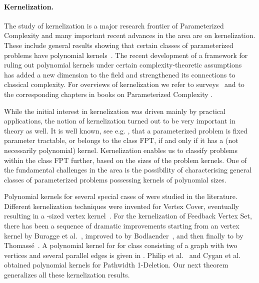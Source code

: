   






\vspace{-.3cm}
\paragraph{Kernelization.}
The study of kernelization is a major research frontier of 
Parameterized Complexity and many important recent advances in the area
are on kernelization. These include 
general results
showing that  certain classes of parameterized problems have polynomial kernels~\cite{Alon:2010vp,H.Bodlaender:2009ng,FominLST10,KratschW12}. 
The recent development of a framework for ruling out polynomial kernels under
certain complexity-theoretic
assumptions~\cite{BDFH08,Dell:2010sh,FS08}    has added a new dimension to
the field and strengthened its connections to classical complexity.  For overviews of kernelization we  refer to surveys~\cite{Bodlaender09,GN07SIGACT}  and to the corresponding chapters in books on Parameterized Complexity 
\cite{FlumGroheBook,Niedermeierbook06}.

While the initial interest in kernelization was driven mainly by practical applications, the notion of kernelization turned out to be very important in theory as well. It is well known, see e.g. \cite{DowneyF99}, that a parameterized problem is fixed parameter tractable, or belongs to the class FPT,  if and only if it has a (not necessarily polynomial) kernel. Kernelization enables us to classify problems within the class FPT further, based on the sizes of the problem kernels. 
One of the fundamental challenges in the area is the possibility of characterising general classes of parameterized problems possessing kernels of polynomial sizes.  

Polynomial kernels for several special cases of \fd{} were studied in the literature.  
 Different kernelization techniques were invented for {\sc Vertex Cover}, eventually resulting in a
 -sized vertex kernel~\cite{AFLS07,ChenKJ01,DFRS04,Hochbaum:1994kl}.
 For the kernelization of {\sc  Feedback Vertex Set}, there has been a sequence of
 dramatic improvements starting from an  vertex kernel by
 Buragge et al.~\cite{BEFLMR2006}, improved to   by
 Bodlaender~\cite{Bod07}, and then finally to  by
 Thomass\'e~\cite{T09}.  A polynomial kernel for \fd{}  for class   consisting of a graph with two vertices and several parallel edges is given in \cite{FominLMPS11}.
 Philip et al.~\cite{PhilipRS09} and Cygan et al.~\cite{CyganPPW10} obtained polynomial kernels for {\sc  Pathwidth 1-Deletion}. Our next theorem generalizes all these kernelization results.   

